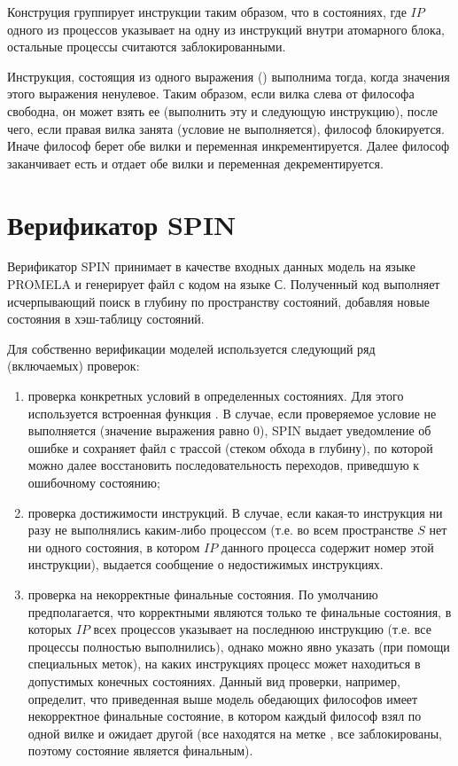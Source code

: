 Конструция  группирует инструкции таким образом, что
в состояниях, где $IP$ одного из процессов указывает на одну из
инструкций внутри атомарного блока, остальные процессы считаются
заблокированными.

Инструкция, состоящия из одного выражения ()
выполнима тогда, когда значения этого выражения ненулевое. Таким
образом, если вилка слева от философа свободна, он может взять ее
(выполнить эту и следующую инструкцию), после чего, если правая вилка
занята (условие  не выполняется),
философ блокируется. Иначе философ берет обе вилки и переменная
 инкрементируется. Далее философ заканчивает есть и
отдает обе вилки и переменная  декрементируется.

\section{Верификатор SPIN}
\label{sec:spin}

Верификатор SPIN принимает в качестве входных данных модель на языке
PROMELA и генерирует файл с кодом на языке С. Полученный код выполняет
исчерпывающий поиск в глубину по пространству состояний, добавляя
новые состояния в хэш-таблицу состояний. 

Для собственно верификации моделей используется следующий ряд
(включаемых) проверок:

\begin{enumerate}
\item проверка конкретных условий в определенных состояниях. Для этого
  используется встроенная функция . В случае, если
  проверяемое условие не выполняется (значение выражения равно 0),
  SPIN выдает уведомление об ошибке и сохраняет файл с трассой (стеком
  обхода в глубину), по которой можно далее восстановить
  последовательность переходов, приведшую к ошибочному состоянию;

\item проверка достижимости инструкций. В случае, если какая-то
  инструкция ни разу не выполнялись каким-либо процессом (т.е. во
  всем пространстве $S$ нет ни одного состояния, в котором $IP$
  данного процесса содержит номер этой инструкции), выдается сообщение
  о недостижимых инструкциях.

\item проверка на некорректные финальные состояния. По умолчанию
  предполагается, что корректными являются только те финальные
  состояния, в которых $IP$ всех процессов указывает на последнюю
  инструкцию (т.е. все процессы полностью выполнились), однако можно
  явно указать (при помощи специальных меток), на каких инструкциях
  процесс может находиться в допустимых конечных состояниях. Данный
  вид проверки, например, определит, что приведенная выше модель
  обедающих философов имеет некорректное финальные состояние, в
  котором каждый философ взял по одной вилке и ожидает другой (все
  находятся на метке , все заблокированы, поэтому
  состояние является финальным). 
\end{enumerate}

